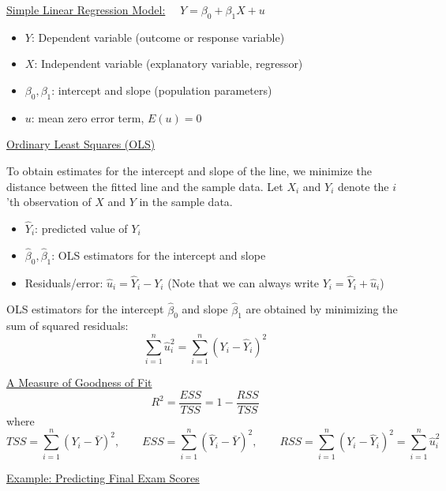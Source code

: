 \documentclass{./../../Latex/handout}
\begin{document}
\thispagestyle{plain}

\underline{Simple Linear Regression Model:} $\quad Y = \beta_0 + \beta_1 X + u $
\begin{itemize}
    \setlength{\itemsep}{0pt}
  \item $Y$: Dependent variable (outcome or response variable)  \item $X$: Independent variable (explanatory variable, regressor)
  \item $\beta_0, \beta_1$: intercept and slope (population parameters)
  \item $u$: mean zero error term, $E(u)=0$
\end{itemize}

\underline{Ordinary Least Squares (OLS)} 

To obtain estimates for the intercept and slope of the line, we minimize the distance between the fitted line and the sample data. Let $X_i$ and $Y_i$ denote the $i$'th observation of $X$ and $Y$ in the sample data. \vspace{-0.5em}
\begin{itemize}
    \setlength{\itemsep}{0pt} 
  \item $\hat{Y}_i$: predicted value of $Y_i$
  \item $\hat{\beta}_0, \hat{\beta}_1$: OLS estimators for the intercept and slope
  \item Residuals/error: $ \hat{u}_i = \hat{Y}_i -Y_i$ (Note that we can always write $ Y_i = \hat{Y}_i + \hat{u}_i $)
\end{itemize}
OLS estimators for the intercept $\hat{\beta}_0$ and slope $\hat{\beta}_1$ are obtained by minimizing the sum of squared residuals: $$ \sum_{i=1}^n \hat{u}_i^2  = \sum_{i=1}^n (Y_i - \hat{Y}_i)^2   $$

\underline{A Measure of Goodness of Fit}
$$ R^2 = \frac{ESS}{TSS} = 1-\frac{RSS}{TSS} $$ 
where $$ TSS = \sum_{i=1}^n (Y_i-\bar{Y})^2, \quad \quad ESS = \sum_{i=1}^n (\hat{Y}_i-\bar{Y})^2, \quad  \quad RSS = \sum_{i=1}^n (Y_i-\hat{Y}_i)^2 =\sum_{i=1}^n \hat{u}_i^2$$

\newpage
\underline{Example: Predicting Final Exam Scores}
\end{document}
